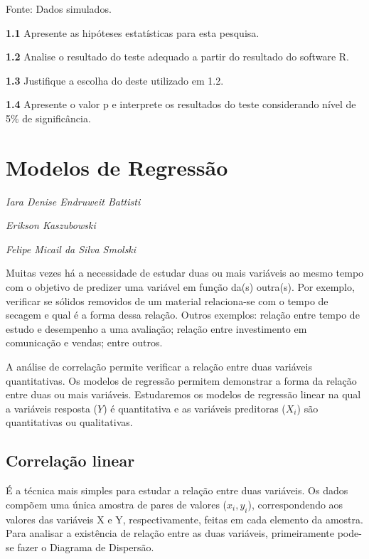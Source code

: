 \documentclass[12pt,brazil,oneside]{book}
\begin{document}
Fonte: Dados simulados.

\textbf{1.1} Apresente as hipóteses estatísticas para esta pesquisa.

\textbf{1.2} Analise o resultado do teste adequado a partir do resultado do software R.

\textbf{1.3} Justifique a escolha do deste utilizado em 1.2.

\textbf{1.4} Apresente o valor p e interprete os resultados do teste considerando nível de 5\% de significância.

\hypertarget{reg}{%
\chapter{Modelos de Regressão}\label{reg}}

\emph{Iara Denise Endruweit Battisti}

\emph{Erikson Kaszubowski}

\emph{Felipe Micail da Silva Smolski}

\begin{flushright}
\emph{}
\end{flushright}

Muitas vezes há a necessidade de estudar duas ou mais variáveis ao mesmo tempo com o objetivo de predizer uma variável em função da(s) outra(s). Por exemplo, verificar se sólidos removidos de um material relaciona-se com o tempo de secagem e qual é a forma dessa relação. Outros exemplos: relação entre tempo de estudo e desempenho a uma avaliação; relação entre investimento em comunicação e vendas; entre outros.

A análise de correlação permite verificar a relação entre duas variáveis quantitativas. Os modelos de regressão permitem demonstrar a forma da relação entre duas ou mais variáveis. Estudaremos os modelos de regressão linear na qual a variáveis resposta (\(Y\)) é quantitativa e as variáveis preditoras (\(X_i\)) são quantitativas ou qualitativas.

\hypertarget{correlacao-linear}{%
\section{Correlação linear}\label{correlacao-linear}}

É a técnica mais simples para estudar a relação entre duas variáveis. Os dados compõem uma única amostra de pares de valores (\(x_i, y_i\)), correspondendo aos valores das variáveis X e Y, respectivamente, feitas em cada elemento da amostra. Para analisar a existência de relação entre as duas variáveis, primeiramente pode-se fazer o Diagrama de Dispersão.
\end{document}
